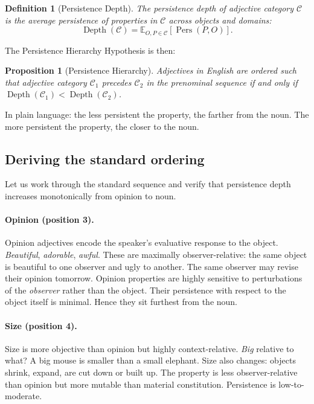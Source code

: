 \documentclass[11pt]{article}
\theoremstyle{rthm}
\newtheorem{proposition}[theorem]{Proposition}
\theoremstyle{rdef}
\newtheorem{definition}[theorem]{Definition}
\theoremstyle{remark}
\newcommand{\Pers}{\operatorname{Pers}}
\newcommand{\Dep}{\operatorname{Depth}}
\begin{document}
\begin{definition}[Persistence Depth]
\label{def:depth}
The \emph{persistence depth} of adjective category $\mathcal{C}$ is the
average persistence of properties in $\mathcal{C}$ across objects and domains:
\[
\Dep(\mathcal{C}) = \mathbb{E}_{O, P \in \mathcal{C}}\!\left[\Pers(P, O)\right].
\]
\end{definition}

The Persistence Hierarchy Hypothesis is then:

\begin{proposition}[Persistence Hierarchy]
\label{prop:hierarchy}
Adjectives in English are ordered such that adjective category $\mathcal{C}_1$
precedes $\mathcal{C}_2$ in the prenominal sequence if and only if
$\Dep(\mathcal{C}_1) < \Dep(\mathcal{C}_2)$.
\end{proposition}

In plain language: the less persistent the property, the farther from the noun.
The more persistent the property, the closer to the noun.

\subsection{Deriving the standard ordering}

Let us work through the standard sequence and verify that persistence depth
increases monotonically from opinion to noun.

\paragraph{Opinion (position 3).}
Opinion adjectives encode the speaker's evaluative response to the object.
\emph{Beautiful}, \emph{adorable}, \emph{awful}. These are maximally
observer-relative: the same object is beautiful to one observer and ugly to
another. The same observer may revise their opinion tomorrow. Opinion
properties are highly sensitive to perturbations of the \emph{observer}
rather than the object. Their persistence with respect to the object itself is
minimal. Hence they sit furthest from the noun.

\paragraph{Size (position 4).}
Size is more objective than opinion but highly context-relative.
\emph{Big} relative to what? A big mouse is smaller than a small elephant.
Size also changes: objects shrink, expand, are cut down or built up. The
property is less observer-relative than opinion but more mutable than
material constitution. Persistence is low-to-moderate.
\end{document}
